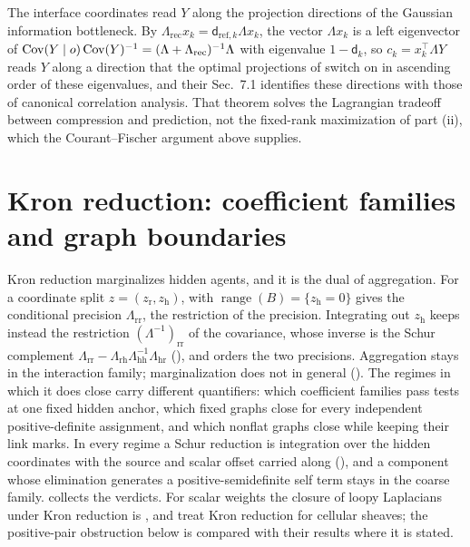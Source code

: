 The interface coordinates read \(Y\) along the projection directions of the Gaussian information bottleneck. By
\(\Lambda_{\mathrm{rec}}x_k=\mathsf d_{\mathrm{ref},k}\Lambda x_k\), the vector \(\Lambda x_k\) is a
left eigenvector of \(\operatorname{Cov}(Y\mid o)\operatorname{Cov}(Y)^{-1}=(\Lambda+\Lambda_{\mathrm{rec}})^{-1}\Lambda\)
with eigenvalue \(1-\mathsf d_k\), so \(c_k=x_k^\top\Lambda Y\) reads \(Y\) along a direction that
the optimal projections of \citet[Sec.~3, Theorem~3.1]{chechik2005information} switch on in
ascending order of these eigenvalues, and their Sec.~7.1 identifies these directions with those of
canonical correlation analysis. That theorem solves the Lagrangian tradeoff between compression and
prediction, not the fixed-rank maximization of part (ii), which the Courant--Fischer argument above
supplies.

\section{Kron reduction: coefficient families and graph boundaries}
\label{sec:cg-kron}

Kron reduction marginalizes hidden agents, and it is the dual of aggregation.
For a coordinate split \(z=(z_{\mathrm r},z_{\mathrm h})\),
 with
\(\operatorname{range}(B)=\{z_{\mathrm h}=0\}\) gives the conditional precision
\(\Lambda_{\mathrm{rr}}\), the restriction of the precision. Integrating out
\(z_{\mathrm h}\) keeps instead the restriction
\((\Lambda^{-1})_{\mathrm{rr}}\) of the covariance, whose inverse is the Schur
complement
\(\Lambda_{\mathrm{rr}}-\Lambda_{\mathrm{rh}}\Lambda_{\mathrm{hh}}^{-1}\Lambda_{\mathrm{hr}}\)
(), and 
orders the two precisions. Aggregation stays in the interaction family;
marginalization does not in general (). The
regimes in which it does close carry different quantifiers: which coefficient
families pass tests at one fixed hidden anchor, which fixed graphs close for
every independent positive-definite assignment, and which nonflat graphs close
while keeping their link marks. In every regime a Schur reduction is
integration over the hidden coordinates with the source and scalar offset
carried along (), and a component whose
elimination generates a positive-semidefinite self term stays in the coarse
family.  collects the verdicts. For scalar weights
the closure of loopy Laplacians under Kron reduction is
\citet[Lemma~II.1]{DorflerBullo2013Kron}, and
\citet[Sec.~4.2, Thm.~4.3]{HansenGhrist2019} treat Kron reduction for cellular
sheaves; the positive-pair obstruction below is compared with their results
where it is stated.

